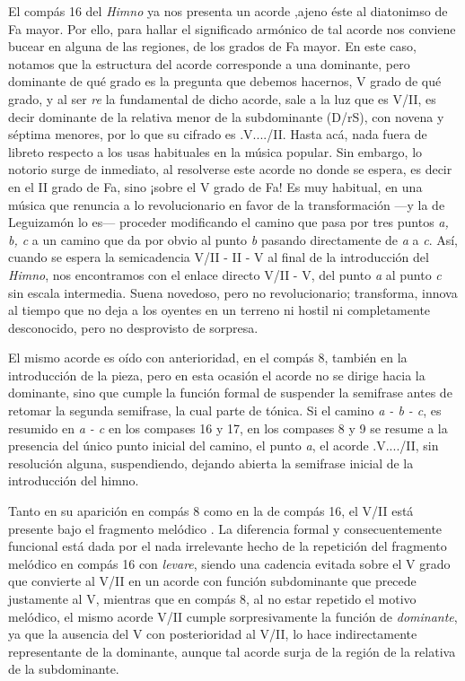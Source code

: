 El compás 16 del \emph{Himno} ya nos presenta un acorde ,ajeno éste al diatonimso de Fa mayor. Por ello, para hallar el significado armónico de tal acorde nos conviene bucear en alguna de las regiones, de los grados de Fa mayor. En este caso, notamos que la estructura del acorde corresponde a una dominante, pero dominante de qué grado es la pregunta que debemos hacernos, V grado de qué grado, y al ser \emph{re} la fundamental de dicho acorde, sale a la luz que es V/II, es decir dominante de la relativa menor de la subdominante (D/rS), con novena y séptima menores, por lo que su cifrado es \acorde.V..../II. Hasta acá, nada fuera de libreto respecto a los usas habituales en la música popular. Sin embargo, lo notorio surge de inmediato, al resolverse este acorde no donde se espera, es decir en el II grado de Fa, sino ¡sobre el V grado de Fa! Es muy habitual, en una música que renuncia a lo revolucionario en favor de la transformación ---y la de Leguizamón lo es--- proceder modificando el camino que pasa por tres puntos \emph{a, b, c} a un camino que da por obvio al punto \emph{b} pasando directamente de \emph{a} a \emph{c}. Así, cuando se espera la semicadencia V/II - II - V al final de la introducción del \emph{Himno}, nos encontramos con el enlace directo V/II - V, del punto \emph{a} al punto \emph{c} sin escala intermedia. Suena novedoso, pero no revolucionario; transforma, innova al tiempo que no deja a los oyentes en un terreno ni hostil ni completamente desconocido, pero no desprovisto de sorpresa.

El mismo acorde es oído con anterioridad, en el compás 8, también en la introducción de la pieza, pero en esta ocasión el acorde no se dirige hacia la dominante, sino que cumple la función formal de suspender la semifrase antes de retomar la segunda semifrase, la cual parte de tónica. Si el camino \emph{a - b - c}, es resumido en \emph{a - c} en los compases 16 y 17, en los compases 8 y 9 se resume a la presencia del único punto inicial del camino, el punto \emph{a}, el acorde \acorde.V..../II, sin resolución alguna, suspendiendo, dejando abierta la semifrase inicial de la introducción del himno.

Tanto en su aparición en compás 8 como en la de compás 16, el V/II está presente bajo el fragmento melódico . La diferencia formal y consecuentemente funcional está dada por el nada irrelevante hecho de la repetición del fragmento melódico  en compás 16 con \emph{levare}, siendo  una cadencia evitada sobre el V grado que convierte al V/II en un acorde con función subdominante que precede justamente al V, mientras que en compás 8, al no estar repetido el motivo melódico, el mismo acorde V/II cumple sorpresivamente la función de \emph{dominante}, ya que la ausencia del V con posterioridad al V/II, lo hace indirectamente representante de la dominante, aunque tal acorde surja de la región de la relativa de la subdominante.

